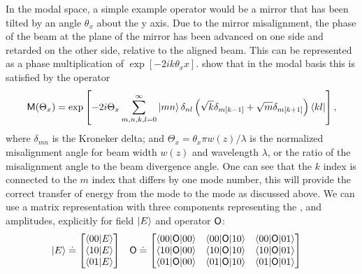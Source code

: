 In the modal space, a simple example operator would be a mirror that has been tilted by an angle $\theta_x$ about the y axis. %
Due to the mirror misalignment, the phase of the beam at the plane of the mirror has been advanced on one side and retarded on the other side, relative to the aligned beam. %
This can be represented as a phase multiplication of $\exp[-2ik\theta_x x]$. %
\citet{Hefetz:97} show that in the modal basis this is satisfied by the operator
\begin{equation}
\mathsf{M}(\Theta_x) = \exp\left[ -2i\Theta_x\sum_{m,n,k,l=0}^\infty \left| mn \right> \delta_{nl} \left( \sqrt k \delta_{m[k-1]}+\sqrt m \delta_{m[k+1]} \right) \left< kl \right|\right],
\end{equation}
where $\delta_{mn}$ is the Kroneker delta; and $\Theta_x = \theta_x \pi w(z)/\lambda$ is the normalized misalignment angle for beam width $w(z)$ and wavelength $\lambda$, or the ratio of the misalignment angle to the beam divergence angle. %
One can see that the $k$ index is connected to the $m$ index that differs by one mode number, this will provide the correct transfer of energy from the  mode to the  mode as discussed above. %
We can use a matrix representation with three components representing the ,  and  amplitudes, explicitly for field $\left| E \right>$ and operator $\mathsf{O}$:
\begin{align}
\vect{E} &\doteq \ms \inprod{00}{E} \\ \inprod{10}{E} \\ \inprod{01}{E} \me
& \oper{O} &\doteq \ms 
\matrixel{00}{\oper{O}}{00} & \matrixel{00}{\oper{O}}{10} & \matrixel{00}{\oper{O}}{01} \\
\matrixel{10}{\oper{O}}{00} & \matrixel{10}{\oper{O}}{10} & \matrixel{10}{\oper{O}}{01} \\
\matrixel{01}{\oper{O}}{00} & \matrixel{01}{\oper{O}}{10} & \matrixel{01}{\oper{O}}{01} \me
\end{align}

